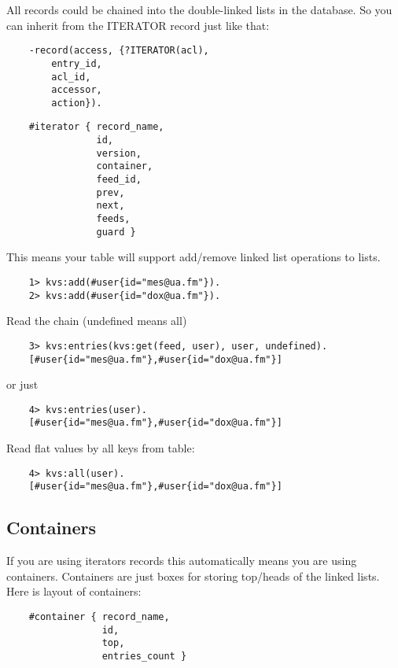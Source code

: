 All records could be chained into the double-linked lists in the database.
So you can inherit from the ITERATOR record just like that:

\begin{lstlisting}
    -record(access, {?ITERATOR(acl),
        entry_id,
        acl_id,
        accessor,
        action}).
\end{lstlisting}

\begin{lstlisting}
    #iterator { record_name,
                id,
                version,
                container,
                feed_id,
                prev,
                next,
                feeds,
                guard }
\end{lstlisting}

This means your table will support add/remove linked list operations to lists.

\begin{lstlisting}
    1> kvs:add(#user{id="mes@ua.fm"}).
    2> kvs:add(#user{id="dox@ua.fm"}).
\end{lstlisting}

Read the chain (undefined means all)

\begin{lstlisting}
    3> kvs:entries(kvs:get(feed, user), user, undefined).
    [#user{id="mes@ua.fm"},#user{id="dox@ua.fm"}]
\end{lstlisting}

or just

\begin{lstlisting}
    4> kvs:entries(user).
    [#user{id="mes@ua.fm"},#user{id="dox@ua.fm"}]
\end{lstlisting}

Read flat values by all keys from table:

\begin{lstlisting}
    4> kvs:all(user).
    [#user{id="mes@ua.fm"},#user{id="dox@ua.fm"}]
\end{lstlisting}

\subsection{Containers}

If you are using iterators records this automatically
means you are using containers. Containers are just boxes
for storing top/heads of the linked lists. Here is layout
of containers:

\begin{lstlisting}
    #container { record_name,
                 id,
                 top,
                 entries_count }
\end{lstlisting}

